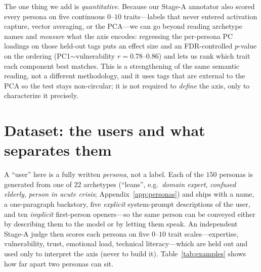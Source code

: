 \documentclass{article}
\begin{document}
The one thing we add is \emph{quantitative}. Because our Stage-A annotator also
scored every persona on five continuous $0$--$10$ traits---labels that never
entered activation capture, vector averaging, or the PCA---we can go beyond reading
archetype names and \emph{measure} what the axis encodes: regressing the
per-persona PC loadings on those held-out tags puts an effect size and an
FDR-controlled $p$-value on the ordering (PC1$\sim$vulnerability $r{=}0.78$--$0.86$)
and lets us rank which trait each component best matches. This is a strengthening of
the same semantic reading, not a different methodology, and it uses tags that are
external to the PCA so the test stays non-circular; it is not required to
\emph{define} the axis, only to characterize it precisely.

\section{Dataset: the users and what separates them}\label{sec:data}
A ``user'' here is a fully written \emph{persona}, not a label. Each of the $150$
personas is generated from one of $22$ archetypes (``leans'', e.g.\ \emph{domain
expert}, \emph{confused elderly}, \emph{person in acute crisis};
Appendix~\ref{app:personas}) and ships with a name, a one-paragraph backstory, five
\emph{explicit} system-prompt descriptions of the user, and ten \emph{implicit}
first-person openers---so the same person can be conveyed either by describing them
to the model or by letting them speak. An independent Stage-A judge then scores each
persona on five $0$--$10$ trait scales---expertise, vulnerability, trust, emotional
load, technical literacy---which are held out and used only to interpret the axis
(never to build it). Table~\ref{tab:examples} shows how far apart two personas can
sit.
\end{document}
